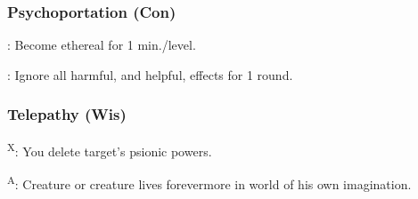 \subsubsection{Psychoportation (Con)}

: Become ethereal for 1 min./level.

: Ignore all harmful, and helpful, effects for 1 round.


\subsubsection{Telepathy (Wis)}

\textsuperscript{X}: You delete target's psionic powers.

\textsuperscript{A}: Creature or creature lives forevermore in world of his own imagination.
